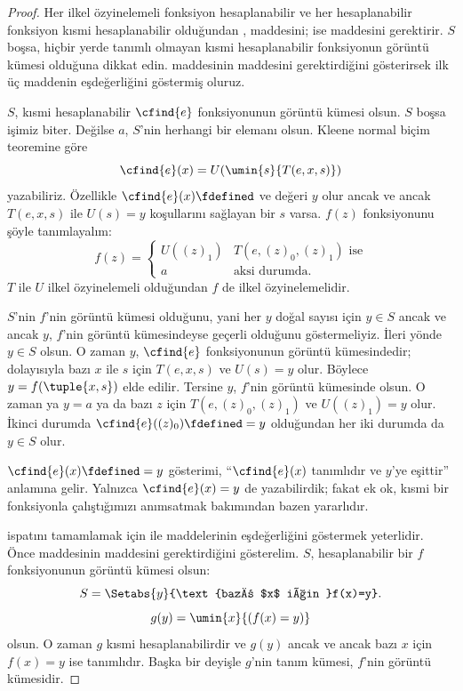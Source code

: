 \begin{proof}
Her ilkel özyinelemeli fonksiyon hesaplanabilir ve her hesaplanabilir
fonksiyon kısmi hesaplanabilir olduğundan ,
 maddesini;  ise
 maddesini gerektirir. $S$ boşsa, hiçbir yerde tanımlı
olmayan kısmi hesaplanabilir fonksiyonun görüntü kümesi olduğuna dikkat edin.
 maddesinin  maddesini gerektirdiğini
gösterirsek ilk üç maddenin eşdeğerliğini göstermiş oluruz.

$S$, kısmi hesaplanabilir $\cfind{e}$ fonksiyonunun görüntü kümesi olsun.
$S$ boşsa işimiz biter. Değilse $a$, $S$'nin herhangi bir elemanı olsun.
Kleene normal biçim teoremine göre
\[
  \cfind{e}(x)=U(\umin{s}{T(e,x,s)})
\]
yazabiliriz. Özellikle $\cfind{e}(x)\fdefined$ ve değeri $y$ olur ancak ve
ancak $T(e,x,s)$ ile $U(s)=y$ koşullarını sağlayan bir $s$ varsa. $f(z)$
fonksiyonunu şöyle tanımlayalım:
\[
  f(z)=\begin{cases}
    U((z)_1) & \text{$T(e,(z)_0,(z)_1)$ ise}\\
    a & \text{aksi durumda.}
  \end{cases}
\]
$T$ ile $U$ ilkel özyinelemeli olduğundan $f$ de ilkel özyinelemelidir.

$S$'nin $f$'nin görüntü kümesi olduğunu, yani her $y$ doğal sayısı için
$y\in S$ ancak ve ancak $y$, $f$'nin görüntü kümesindeyse geçerli olduğunu
göstermeliyiz. İleri yönde $y\in S$ olsun. O zaman $y$, $\cfind{e}$
fonksiyonunun görüntü kümesindedir; dolayısıyla bazı $x$ ile $s$ için
$T(e,x,s)$ ve $U(s)=y$ olur. Böylece $y=f(\tuple{x,s})$ elde edilir.
Tersine $y$, $f$'nin görüntü kümesinde olsun. O zaman ya $y=a$ ya da bazı
$z$ için $T(e,(z)_0,(z)_1)$ ve $U((z)_1)=y$ olur. İkinci durumda
$\cfind{e}((z)_0)\fdefined=y$ olduğundan her iki durumda da $y\in S$ olur.

$\cfind{e}(x)\fdefined=y$ gösterimi, ``$\cfind{e}(x)$ tanımlıdır ve $y$'ye
eşittir'' anlamına gelir. Yalnızca $\cfind{e}(x)=y$ de yazabilirdik; fakat ek
ok, kısmi bir fonksiyonla çalıştığımızı anımsatmak bakımından bazen yararlıdır.

 ispatını tamamlamak için  ile
 maddelerinin eşdeğerliğini göstermek yeterlidir. Önce
 maddesinin  maddesini gerektirdiğini
gösterelim. $S$, hesaplanabilir bir $f$ fonksiyonunun görüntü kümesi olsun:
\[
  S=\Setabs{y}{\text{bazı $x$ için }f(x)=y}.
\]
\[
  g(y)=\umin{x}{(f(x)=y)}
\]
olsun. O zaman $g$ kısmi hesaplanabilirdir ve $g(y)$ ancak ve ancak bazı
$x$ için $f(x)=y$ ise tanımlıdır. Başka bir deyişle $g$'nin tanım kümesi,
$f$'nin görüntü kümesidir. 


\end{proof}
